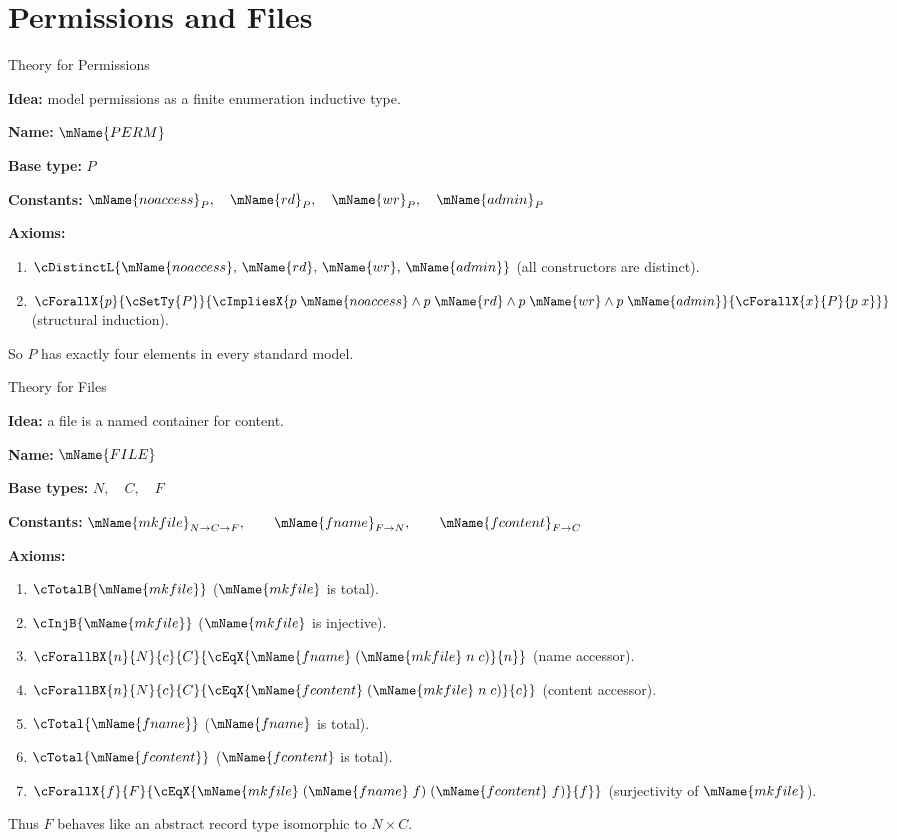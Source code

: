 \documentclass[aspectratio=169]{beamer}
\newcommand{\PERM}{\mName{PERM}}
\newcommand{\FILETYPE}{\mName{FILE}}
\newcommand{\mkfile}{\mName{mkfile}}
\newcommand{\fname}{\mName{fname}}
\newcommand{\fcontent}{\mName{fcontent}}
\begin{document}
\section{Permissions and Files}

\begin{frame}{Theory for Permissions}

\textbf{Idea:} model permissions as a finite enumeration inductive type.

\medskip
\medskip

\textbf{Name:} $\PERM$

\textbf{Base type:}  $P$

\textbf{Constants:}
$
\mName{noaccess}_P,\quad
\mName{rd}_P,\quad
\mName{wr}_P,\quad
\mName{admin}_P
$

\textbf{Axioms:}
\begin{enumerate}
  \item $\cDistinctL{\mName{noaccess},\, \mName{rd},\, \mName{wr},\, \mName{admin}}$
  \hfill (all constructors are distinct).
  \item $\cForallX{p}{\cSetTy{P}}{
      \cImpliesX{p\;\mName{noaccess} \wedge p\;\mName{rd} \wedge p\;\mName{wr} \wedge p\;\mName{admin}}{
        \cForallX{x}{P}{p\;x}}}$
        \hfill (structural induction).
\end{enumerate}

\medskip
So $P$ has exactly four elements in every standard model.
\end{frame}

\begin{frame}{Theory for Files}

\textbf{Idea:} a file is a named container for content.

\medskip
\textbf{Name:} $\FILETYPE$

\textbf{Base types:} $N,\quad C,\quad F$

\textbf{Constants:}
$\mkfile_{N \to C \to F},\qquad
\fname_{F \to N},\qquad
\fcontent_{F \to C}$

\textbf{Axioms:}
\begin{enumerate}
    \item $\cTotalB{\mkfile}$
    \hfill ($\mkfile$ is total).
    \item $\cInjB{\mkfile}$
    \hfill ($\mkfile$ is injective).
    \item $\cForallBX{n}{N}{c}{C}{
      \cEqX{\fname\;(\mkfile\;n\;c)}{n}}$
    \hfill (name accessor).
    \item $\cForallBX{n}{N}{c}{C}{
      \cEqX{\fcontent\;(\mkfile\;n\;c)}{c}}$
    \hfill (content accessor).
    \item $\cTotal{\fname}$
    \hfill ($\fname$ is total).
    \item $\cTotal{\fcontent}$
    \hfill ($\fcontent$ is total).
    \item $\cForallX{f}{F}{\cEqX{\mkfile\;(\fname\;f)\;(\fcontent\;f)}{f}}$
    \hfill (surjectivity of $\mkfile$).
\end{enumerate}

\medskip
Thus $F$ behaves like an abstract record type isomorphic to $N \times C$.
\end{frame}
\end{document}
